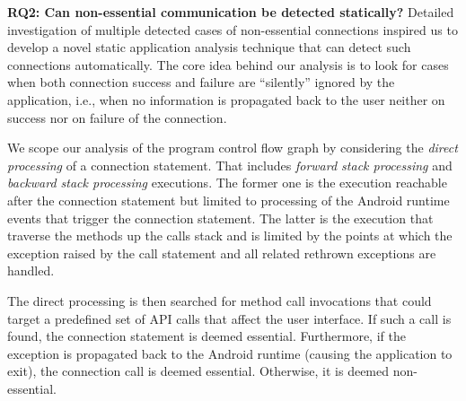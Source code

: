 \noindent 
{\bf RQ2: Can non-essential communication be detected statically?}
Detailed investigation of multiple detected cases of non-essential
connections inspired us to develop a novel static application analysis technique that
can detect such connections automatically.  The core idea behind our
analysis is to look for cases when both connection success and failure are ``silently'' ignored by the application, i.e., when no information is propagated back to the user neither on success nor on   failure of the connection. 

We scope our analysis of the program control flow graph by considering the \emph{direct processing} of a connection statement. 
That includes \emph{forward stack processing} and \emph{backward stack processing} executions. 
The former one is the execution reachable after the connection statement but limited to processing of the Android runtime events that trigger the connection statement.
The latter is the execution that traverse the methods up the calls stack and is limited by the points at which the exception raised by the call statement and all related rethrown exceptions are handled. 



%

The direct processing is then
searched for method call invocations that could target a predefined
set of API calls that affect the user interface.  If such a call is
found, the connection statement is deemed essential.  Furthermore, 
if the exception is propagated back to the Android runtime (causing the application to exit), the connection call is deemed essential.
Otherwise, it is deemed non-essential.

